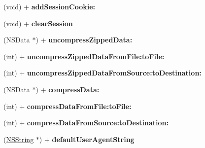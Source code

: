\begin{DoxyCompactItemize}
\item 
\hypertarget{interface_a_s_i_h_t_t_p_request_a9a6621daa1c2571d9d1cc0d46f912e56}{
(void) + {\bfseries addSessionCookie:}}
\label{interface_a_s_i_h_t_t_p_request_a9a6621daa1c2571d9d1cc0d46f912e56}

\item 
\hypertarget{interface_a_s_i_h_t_t_p_request_a85b93e4b30cdf106e45ee1b8d3a28f3d}{
(void) + {\bfseries clearSession}}
\label{interface_a_s_i_h_t_t_p_request_a85b93e4b30cdf106e45ee1b8d3a28f3d}

\item 
\hypertarget{interface_a_s_i_h_t_t_p_request_ab90a4101dc5b523195821de12ceae102}{
(NSData $\ast$) + {\bfseries uncompressZippedData:}}
\label{interface_a_s_i_h_t_t_p_request_ab90a4101dc5b523195821de12ceae102}

\item 
\hypertarget{interface_a_s_i_h_t_t_p_request_a2c4b220e54857d69fa7235bd6c78a294}{
(int) + {\bfseries uncompressZippedDataFromFile:toFile:}}
\label{interface_a_s_i_h_t_t_p_request_a2c4b220e54857d69fa7235bd6c78a294}

\item 
\hypertarget{interface_a_s_i_h_t_t_p_request_ae130a9053eb4b82f3bd963982ae835ac}{
(int) + {\bfseries uncompressZippedDataFromSource:toDestination:}}
\label{interface_a_s_i_h_t_t_p_request_ae130a9053eb4b82f3bd963982ae835ac}

\item 
\hypertarget{interface_a_s_i_h_t_t_p_request_a757f9e14bc7fb114713251f22f16f266}{
(NSData $\ast$) + {\bfseries compressData:}}
\label{interface_a_s_i_h_t_t_p_request_a757f9e14bc7fb114713251f22f16f266}

\item 
\hypertarget{interface_a_s_i_h_t_t_p_request_aa29ce97a20c2e9723a3feea159ceccbd}{
(int) + {\bfseries compressDataFromFile:toFile:}}
\label{interface_a_s_i_h_t_t_p_request_aa29ce97a20c2e9723a3feea159ceccbd}

\item 
\hypertarget{interface_a_s_i_h_t_t_p_request_a849507cf9413104d084a233da0851f8e}{
(int) + {\bfseries compressDataFromSource:toDestination:}}
\label{interface_a_s_i_h_t_t_p_request_a849507cf9413104d084a233da0851f8e}

\item 
\hypertarget{interface_a_s_i_h_t_t_p_request_adde353be686c11a87e7c2bb1f3b66fea}{
(\hyperlink{class_n_s_string}{NSString} $\ast$) + {\bfseries defaultUserAgentString}}
\label{interface_a_s_i_h_t_t_p_request_adde353be686c11a87e7c2bb1f3b66fea}


\end{DoxyCompactItemize}

